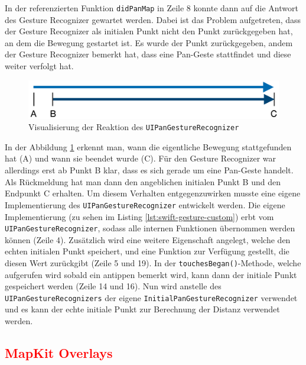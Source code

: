 In der referenzierten Funktion \texttt{didPanMap} in Zeile 8 konnte dann auf die Antwort des Gesture Recognizer gewartet werden.\pbreak%
%
Dabei ist das Problem aufgetreten, dass der Gesture Recognizer als initialen Punkt nicht den Punkt zurückgegeben hat, an dem die Bewegung gestartet ist.
Es wurde der Punkt zurückgegeben, andem der Gesture Recognizer bemerkt hat, dass eine Pan-Geste stattfindet und diese weiter verfolgt hat.
\begin{figure}[h]
	\centering
	\includegraphics[scale=0.25]{images/pangesture.png}
	\caption{Visualisierung der Reaktion des \texttt{UIPanGestureRecognizer}}
	\label{fig:pangesture}
\end{figure}
In der Abbildung \ref{fig:pangesture} erkennt man, wann die eigentliche Bewegung stattgefunden hat (A) und wann sie beendet wurde (C).
Für den Gesture Recognizer war allerdings erst ab Punkt B klar, dass es sich gerade um eine Pan-Geste handelt.
Als Rückmeldung hat man dann den angeblichen initialen Punkt B und den Endpunkt C erhalten.
Um diesem Verhalten entgegenzuwirken musste eine eigene Implementierung des \texttt{UIPanGestureRecognizer} entwickelt werden.
Die eigene Implementierung (zu sehen im Listing \ref{lst:swift-gesture-custom}) erbt vom \texttt{UIPanGestureRecognizer}, sodass alle internen Funktionen übernommen werden können (Zeile 4).
Zusätzlich wird eine weitere Eigenschaft angelegt, welche den echten initialen Punkt speichert, und eine Funktion zur Verfügung gestellt, die diesen Wert zurückgibt (Zeile 5 und 19).
In der \texttt{touchesBegan()}-Methode, welche aufgerufen wird sobald ein antippen bemerkt wird, kann dann der initiale Punkt gespeichert werden (Zeile 14 und 16).
Nun wird anstelle des \texttt{UIPanGestureRecognizers} der eigene \texttt{InitialPanGestureRecognizer} verwendet und es kann der echte initiale Punkt zur Berechnung der Distanz verwendet werden.

\subsection{\textcolor{red}{MapKit Overlays}}

